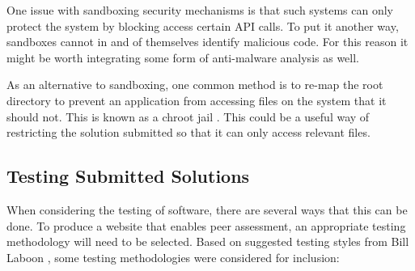 \documentclass[a4paper,11pt]{report}
\begin{document}
One issue with sandboxing security mechanisms is that such systems can only protect the system by blocking access certain API calls. To put it another way, sandboxes cannot in and of themselves identify malicious code. For this reason it might be worth integrating some form of anti-malware analysis as well.\par
As an alternative to sandboxing, one common method is to re-map the root directory to prevent an application from accessing files on the system that it should not. This is known as a chroot jail \cite{ubuntu_basic_2016}. This could be a useful way of restricting the solution submitted so that it can only access relevant files.

\subsection{Testing Submitted Solutions}
When considering the testing of software, there are several ways that this can be done. To produce a website that enables peer assessment, an appropriate testing methodology will need to be selected. Based on suggested testing styles from Bill Laboon \cite{laboon_friendly_2016}, some testing methodologies were considered for inclusion:
\end{document}
